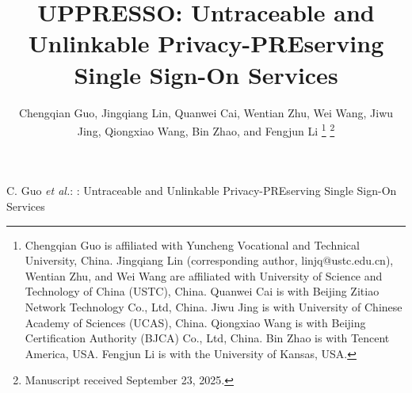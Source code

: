 \documentclass[journal,lettersize]{IEEEtran}
\begin{document}
\title{UPPRESSO: Untraceable and Unlinkable Privacy-PREserving Single Sign-On Services}


\author{Chengqian Guo, Jingqiang Lin, Quanwei Cai, Wentian Zhu, Wei Wang, Jiwu Jing, Qiongxiao Wang, Bin Zhao, and Fengjun Li
\thanks{Chengqian Guo is affiliated with Yuncheng Vocational and Technical University, China. Jingqiang Lin (corresponding author, linjq@ustc.edu.cn), Wentian Zhu, and Wei Wang are affiliated with University of Science and Technology of China (USTC), China. Quanwei Cai is with Beijing Zitiao Network Technology Co., Ltd, China. Jiwu Jing is with University of Chinese Academy of Sciences (UCAS), China. Qiongxiao Wang is with Beijing Certification Authority (BJCA) Co., Ltd, China. Bin Zhao is with Tencent America, USA. Fengjun Li is with the University of Kansas, USA.}%
\thanks{Manuscript received September 23, 2025.}
}

%
{C. Guo \MakeLowercase{\textit{et al.}}: \usso: Untraceable and Unlinkable Privacy-PREserving Single Sign-On Services}


\maketitle


\end{document}
